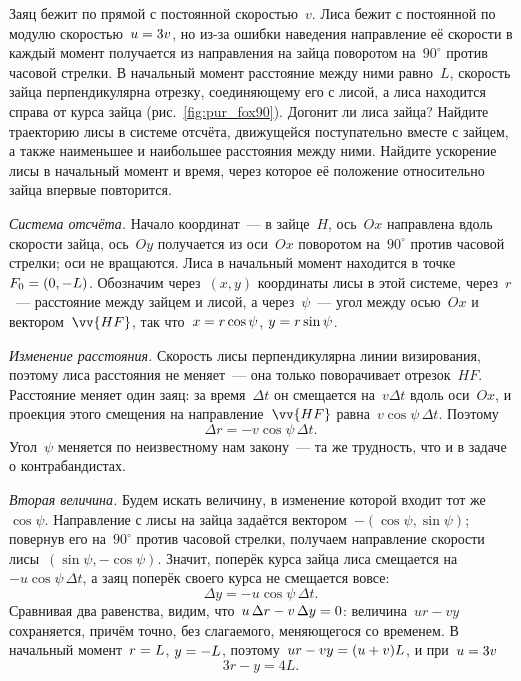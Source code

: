 \documentclass[../main.tex]{subfiles}
\begin{document}
\begin{example}
Заяц бежит по прямой с постоянной скоростью~$v$. Лиса бежит с постоянной по модулю
скоростью~$u \hm= 3v$, но из-за ошибки наведения направление её скорости в каждый
момент получается из направления на зайца поворотом на~$90^\circ$ против часовой
стрелки. В начальный момент расстояние между ними равно~$L$, скорость зайца
перпендикулярна отрезку, соединяющему его с лисой, а лиса находится справа от курса
зайца (рис.~\ref{fig:pur_fox90}). Догонит ли лиса зайца? Найдите траекторию лисы в
системе отсчёта, движущейся поступательно вместе с зайцем, а также наименьшее и
наибольшее расстояния между ними. Найдите ускорение лисы в начальный момент и время,
через которое её положение относительно зайца впервые повторится.\label{ex:pur_fox90}


\noindent\textit{Система отсчёта.} Начало координат~--- в зайце~$H$, ось~$Ox$
направлена вдоль скорости зайца, ось~$Oy$ получается из оси~$Ox$ поворотом на~$90^\circ$
против часовой стрелки; оси не вращаются. Лиса в начальный момент находится в точке~$F_0 \hm= (0, -L)$. Обозначим через~$(x, y)$ координаты лисы в этой системе, через~$r$~--- расстояние между зайцем и лисой, а через~$\psi$~--- угол между осью~$Ox$ и
вектором~$\vv{HF}$, так что~$x \hm= r\cos\psi$, $y \hm= r\sin\psi$.

\noindent\textit{Изменение расстояния.} Скорость лисы перпендикулярна линии
визирования, поэтому лиса расстояния не меняет~--- она только поворачивает отрезок~$HF$. Расстояние меняет один заяц: за время~$\Delta t$ он смещается на~$v\Delta t$
вдоль оси~$Ox$, и проекция этого смещения на направление~$\vv{HF}$ равна~$v\cos\psi\,\Delta t$. Поэтому
\[
\Delta r = -v\cos\psi\,\Delta t.
\]
Угол~$\psi$ меняется по неизвестному нам закону~--- та же трудность, что и в задаче о
контрабандистах.

\noindent\textit{Вторая величина.} Будем искать величину, в изменение которой входит
тот же~$\cos\psi$. Направление с лисы на зайца задаётся вектором~$-(\cos\psi, \sin\psi)$; повернув его на~$90^\circ$ против часовой стрелки, получаем
направление скорости лисы~$(\sin\psi, -\cos\psi)$. Значит, поперёк курса зайца лиса
смещается на~$-u\cos\psi\,\Delta t$, а заяц поперёк своего курса не смещается вовсе:
\[
\Delta y = -u\cos\psi\,\Delta t.
\]
Сравнивая два равенства, видим, что~$u\,\Delta r - v\,\Delta y \hm= 0$: величина~$ur - vy$ сохраняется, причём точно, без слагаемого, меняющегося со временем. В
начальный момент~$r \hm= L$, $y \hm= -L$, поэтому~$ur - vy \hm= (u + v)L$, и
при~$u \hm= 3v$
\[
3r - y = 4L.
\]


\end{example}
\end{document}
